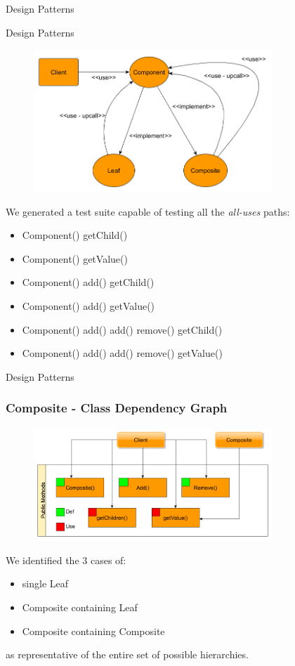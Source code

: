 \documentclass{beamer}
\begin{document}
\begin{section}{Design Patterns}
\begin{subsection}{Design Patterns}
\begin{frame}
\begin{figure}[!h]
	\centering
	\includegraphics[width=0.8\textwidth]{./Composite/ClassDepencyGraph.png}	
	\label{Codepengraph}
\end{figure}
We generated a test suite capable of testing all the \textit{all-uses} paths:
\begin{itemize}
	\item Component() getChild()
	\item Component() getValue()
	\item Component() add() getChild()
	\item Component() add() getValue()
	\item Component() add() add() remove() getChild()
	\item Component() add() add() remove() getValue() 
\end{itemize} 		
	\end{frame}
\end{subsection}

\begin{subsection}{Design Patterns}
	\begin{frame}
		\frametitle{Composite - Class Dependency Graph}
		
		\begin{figure}[!h]
			\centering
			\includegraphics[width=0.8\textwidth]{./Composite/CallGraph.png}
			
			\label{Codataflow}
		\end{figure}
We identified the 3 cases of:
\begin{itemize}
	\item single Leaf
	\item Composite containing Leaf
	\item Composite containing Composite
\end{itemize}
as representative of the entire set of possible hierarchies.


\end{frame}
\end{subsection}
\end{section}
\end{document}
